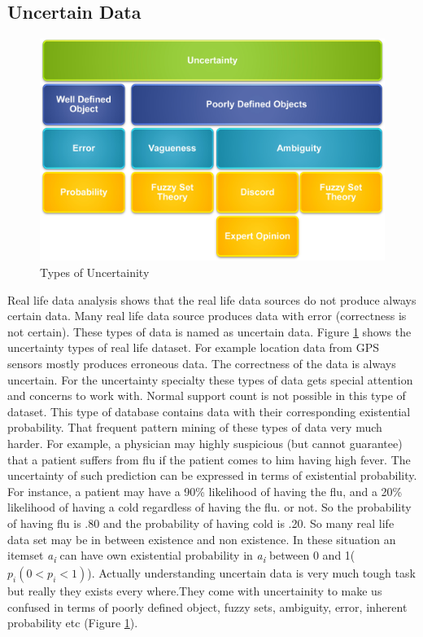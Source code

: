 \subsection{Uncertain Data}
\begin{figure}
\centering
  \includegraphics[width=.9\textwidth]{images/uncertainity_type.jpg}
\caption{Types of Uncertainity}
\label{figure:uncertainity_type}
\end{figure}
Real life data analysis shows that the real life data sources do not produce always certain data. Many real life data source produces data with error (correctness is not certain). These types of data is named as uncertain data. Figure \ref{figure:uncertainity_type} shows the uncertainty types of real life dataset. For example location data from GPS sensors mostly produces erroneous data. The correctness of the data is always uncertain. For the uncertainty specialty these types of data gets special attention and concerns to work with. Normal support count is not possible in this type of dataset. This type of database contains data with their corresponding existential probability. That frequent pattern mining of these types of data very much harder. For example, a physician may highly suspicious (but cannot guarantee) that a patient suffers from flu if the patient comes to him having high fever. The uncertainty of such prediction can be expressed in terms of existential probability. For instance, a patient may have a 90\% likelihood of having the flu, and a 20\% likelihood of having a cold regardless of having the flu. or not. So the probability of having flu is .80 and the probability of having cold is .20. So many real life data set may be in between existence and non existence. In these situation an itemset \emph{a\textsubscript{i}} can have own existential probability in \emph{a\textsubscript{i}} between 0 and 1($p_i(0<p_i<1)$). Actually understanding uncertain data is very much tough task but really they exists every where.They come with uncertainity to make us confused in terms of poorly defined object, fuzzy sets, ambiguity, error, inherent probability etc (Figure \ref{figure:uncertainity_type}).\\
